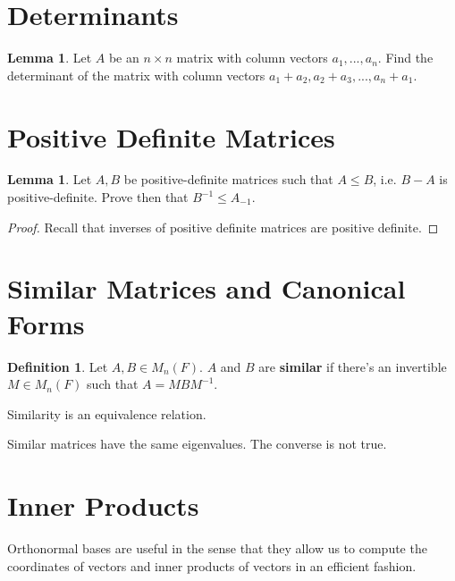 \documentclass{article}
\theoremstyle{definition}
\newtheorem{definition}{Definition}
\newtheorem{lemma}[theorem]{Lemma}
\begin{document}
\newpage

\section{Determinants}

\begin{lemma}
    Let $A$ be an $n \times n$ matrix with column vectors $a_{1},...,a_{n}$.
    Find the determinant of the matrix with column vectors $a_{1} + a_{2},a_{2} + a_{3},...,a_{n} + a_{1}$.
\end{lemma}


\newpage

\section{Positive Definite Matrices}

\begin{lemma}
    Let $A,B$ be positive-definite matrices such that $A \leq B$, i.e. $B-A$ is positive-definite.
    Prove then that $B^{-1} \leq A_{-1}$.
\end{lemma}
\begin{proof}
    Recall that inverses of positive definite matrices are positive definite.


\end{proof}

\newpage

\section{Similar Matrices and Canonical Forms}

\begin{definition}
    Let $A,B \in M_{n}(F)$. $A$ and $B$ are \textbf{similar} if 
    there's an invertible $M \in M_{n}(F)$ such that $A = MBM^{-1}$.
\end{definition}

Similarity is an equivalence relation.

Similar matrices have the same eigenvalues. The converse is not true. 

\newpage

\section{Inner Products}

Orthonormal bases are useful in the sense that they allow us to compute the coordinates of 
vectors and inner products of vectors in an efficient fashion.
\end{document}
